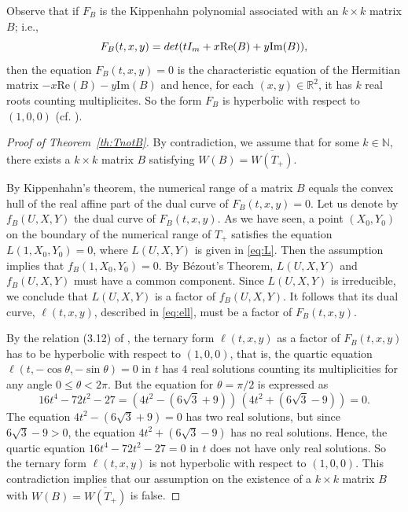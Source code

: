\documentclass[12pt,reqno]{amsart}
\theoremstyle{definition}
\newcommand{\ovl}[1]{\overline{#1}}	%
\newcommand{\R}{{\mathbb{R}}}
\newcommand{\N}{{\mathbb{N}}}
\renewcommand{\Re}{\ensuremath{\mathrm{Re}}}
\renewcommand{\Im}{\ensuremath{\mathrm{Im}}}
\begin{document}
Observe that if $F_B$ is the Kippenhahn polynomial associated with an $k \times k$ matrix $B$; i.e.,
 \[
 F_{B}(t, x, y)={\rm det}(t I_m +x \Re(B) +y \Im(B)),
 \]
then the equation $F_{B}(t, x, y)=0$ is the characteristic equation of the Hermitian matrix $-x \Re(B) -y \Im(B)$ and hence, for each $(x,y) \in \R^2$, it has $k$ real roots counting  multiplicites. So the form $F_{B}$ is hyperbolic with respect to $(1,0,0)$  (cf. \cite{Kip}). 

\begin{proof}[Proof of Theorem~\ref{th:TnotB}]
By contradiction, we assume that for some $k \in \N$, there exists a $k \times k$ matrix $B$ satisfying  $W(B)=\ovl{W(T_+)}$. 

By Kippenhahn's theorem, the numerical range of a matrix $B$ equals the convex hull of the real affine part of the dual curve of $F_B(t,x,y)=0$. Let us denote by $f_B(U,X,Y)$ the dual curve of $F_B(t,x,y)$. As we have seen, a point $(X_0,Y_0)$ on the boundary of the numerical range of $T_+$ satisfies the equation $L(1,X_0,Y_0)=0$, where $L(U,X,Y)$ is given in \eqref{eq:L}. Then the assumption implies that $f_B(1,X_0,Y_0)=0$. By B\'ezout's Theorem, $L(U,X,Y)$ and $f_B(U,X,Y)$ must have a common component. Since $L(U,X,Y)$ is irreducible, we conclude that $L(U,X,Y)$ is a factor of $f_B(U,X,Y)$. It follows that its dual curve, $\ell(t,x,y)$, described in \eqref{eq:ell}, must be a factor of $F_B(t,x,y)$.

By the relation (3.12) of \cite[p. 130]{ABG}, the ternary form $\ell(t, x, y)$ as a factor of $F_{B}(t, x, y)$ has to be hyperbolic with respect to $(1,0,0)$, that is, the quartic equation $\ell(t, -\cos \theta, -\sin \theta)=0$ in $t$ has $4$ real solutions counting its multiplicities for any angle $0 \leq \theta < 2\pi$. But the equation for $\theta=\pi/2$ is expressed as 
\[
16 t^4 -72 t^2 -27= \left( 4 t^2 -(6\sqrt{3}+9) \right) \,  \left( 4 t^2 +(6 \sqrt{3}-9)\right)=0.
\]
The equation $4 t^2 -(6 \sqrt{3} +9)=0$ has two real solutions, but since $6 \sqrt{3}-9 > 0$, the equation $4 t^2 +(6 \sqrt{3}-9)$ has no real solutions. Hence, the quartic equation $16t^4-72 t^2 -27=0$ in $t$ does not have only real solutions. So the ternary form $\ell(t, x, y)$ is not hyperbolic with respect to $(1,0,0)$. This contradiction implies that our assumption on the existence of  a $k\times k$ matrix $B$ with $W(B)=\ovl{W(T_+)}$ is false. 
\end{proof}



{}
\end{document}
